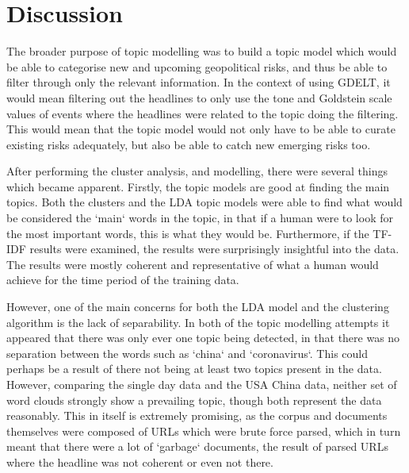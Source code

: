 \section{Discussion}
The broader purpose of topic modelling was to build a topic model which would be able to categorise new and upcoming geopolitical risks, and thus be able to filter through only the relevant information. In the context of using GDELT, it would mean filtering out the headlines to only use the tone and Goldstein scale values of events where the headlines were related to the topic doing the filtering. This would mean that the topic model would not only have to be able to curate existing risks adequately, but also be able to catch new emerging risks too.

After performing the cluster analysis, and modelling, there were several things which became apparent. Firstly, the topic models are good at finding the main topics. Both the clusters and the LDA topic models were able to find what would be considered the `main` words in the topic, in that if a human were to look for the most important words, this is what they would be. Furthermore, if the TF-IDF results were examined, the results were surprisingly insightful into the data. The results were mostly coherent and representative of what a human would achieve for the time period of the training data.

However, one of the main concerns for both the LDA model and the clustering algorithm is the lack of separability. In both of the topic modelling attempts it appeared that there was only ever one topic being detected, in that there was no separation between the words such as `china` and `coronavirus`. This could perhaps be a result of there not being at least two topics present in the data. However, comparing the single day data and the USA China data, neither set of word clouds strongly show a prevailing topic, though both represent the data reasonably. This in itself is extremely promising, as the corpus and documents themselves were composed of URLs which were brute force parsed, which in turn meant that there were a lot of `garbage` documents, the result of parsed URLs where the headline was not coherent or even not there.

